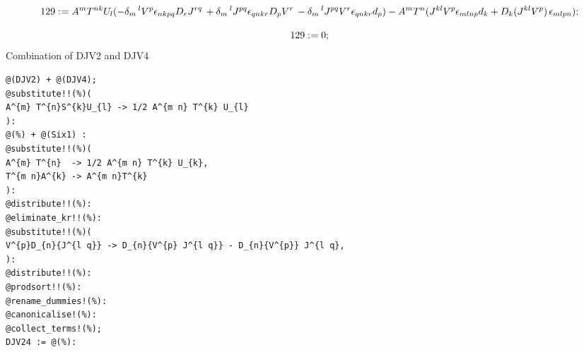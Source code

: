\documentclass[11pt]{article}
\def\specialcolon{\mathrel{\mathop{:}}\hspace{-.5em}}
\begin{document}
\begin{dmath*}[compact, spread=2pt]
129\specialcolon{}= {A}^{m} {T}^{n k} {U}_{l} ( - {\delta}_{m}\,^{l} {V}^{p} {\epsilon}_{n k p q} {D}_{r}{{J}^{r q}}\,  + {\delta}_{m}\,^{l} {J}^{p q} {\epsilon}_{q n k r} {D}_{p}{{V}^{r}}\,  - {\delta}_{m}\,^{l} {J}^{p q} {V}^{r} {\epsilon}_{q n k r} {d}_{p}) - {A}^{m} {T}^{n} ({J}^{k l} {V}^{p} {\epsilon}_{m l n p} {d}_{k} + {D}_{k}{({J}^{k l} {V}^{p})}\,  {\epsilon}_{m l p n});
\end{dmath*}


\begin{dmath*}[compact, spread=2pt]
129\specialcolon{}= 0;
\end{dmath*}
Combination of DJV2 and DJV4
{\color[named]{Blue}\begin{verbatim}
@(DJV2) + @(DJV4);
@substitute!!(%)(
A^{m} T^{n}S^{k}U_{l} -> 1/2 A^{m n} T^{k} U_{l}
):
@(%) + @(Six1) :
@substitute!!(%)(
A^{m} T^{n}  -> 1/2 A^{m n} T^{k} U_{k},
T^{m n}A^{k} -> A^{m n}T^{k}
):
@distribute!!(%):
@eliminate_kr!!(%):
@substitute!!(%)(
V^{p}D_{n}{J^{l q}} -> D_{n}{V^{p} J^{l q}} - D_{n}{V^{p}} J^{l q},
):
@distribute!!(%):
@prodsort!!(%):
@rename_dummies!(%):
@canonicalise!(%):
@collect_terms!(%);
DJV24 := @(%):
\end{verbatim}}
\end{document}

